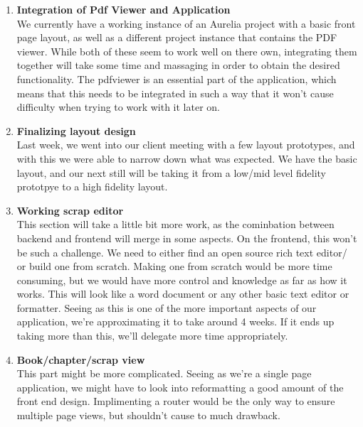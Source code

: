 \documentclass[onecolumn, draftclsnofoot,10pt, compsoc]{IEEEtran}
\begin{document}
\begin{enumerate}
    \item
    \textbf{Integration of Pdf Viewer and Application} \\
	We currently have a working instance of an Aurelia project with a basic front page layout,
	as well as a different project instance that contains the PDF viewer. While both of these
	seem to work well on there own, integrating them together will take some time and massaging
	in order to obtain the desired functionality. The pdfviewer is an essential part of the
	application, which means that this needs to be integrated in such a way that it won't cause
	difficulty when trying to work with it later on. \\

    \item
    \textbf{Finalizing layout design} \\

	Last week, we went into our client meeting with a few layout prototypes, and with this we
	were able to narrow down what was expected. We have the basic layout, and our next still
	will be taking it from a low/mid level fidelity prototpye to a high fidelity layout. \\

	\item
	\textbf{Working scrap editor} \\

	This section will take a little bit more work, as the cominbation between backend and
	frontend will merge in some aspects. On the frontend, this won't be such a challenge.
	We need to either find an open source rich text editor/ or build one from scratch.
	Making one from scratch would be more time consuming, but we would have more control
	and knowledge as far as how it works. This will look like a word document or any other
	basic text editor or formatter. Seeing as this is one of the more important aspects of
	our application, we’re approximating it to take around 4 weeks. If it ends up taking more
	than this, we’ll delegate more time appropriately. \\

	\item
	\textbf{Book/chapter/scrap view} \\

	This part might be more complicated. Seeing as we're a single page application, we might
	have to look into reformatting a good amount of the front end design. Implimenting a router
	would be the only way to ensure multiple page views, but shouldn't cause to much drawback. \\


\end{enumerate}
\end{document}

